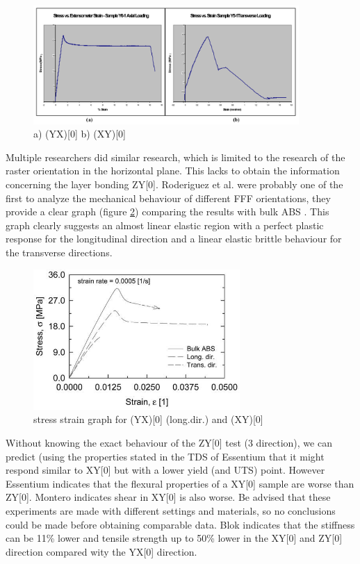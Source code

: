 \begin{figure}[H]
    \centering
    \includegraphics[width=0.9\textwidth]{chapter_2/figures/Transverseraster.PNG}
    \caption{a) (YX)[0] b) (XY)[0] \cite{Montero2001MaterialExperiments}}
    \label{fig:Transverseraster}
\end{figure}

Multiple researchers did similar research, which is limited to the research of the raster orientation in the horizontal plane. This lacks to obtain the information concerning the layer bonding ZY[0]. Roderiguez et al. were probably one of the first to analyze the mechanical behaviour of different FFF orientations, they provide a clear graph (figure \ref{fig:Rodriguezgraph}) comparing the results with bulk ABS \cite{Rodriguez2001MechanicalInvestigation}. This graph clearly suggests an almost linear elastic region with a perfect plastic response for the longitudinal direction and a linear elastic brittle behaviour for the transverse directions. 

\begin{figure}[H]
    \centering
    \includegraphics[width=0.7\textwidth]{chapter_2/figures/Rodriguezgraph.jpg}
    \caption{stress strain graph for (YX)[0] (long.dir.) and (XY)[0] \cite{Rodriguez2001MechanicalInvestigation}}
    \label{fig:Rodriguezgraph}
\end{figure}

Without knowing the exact behaviour of the ZY[0] test (3 direction), we can predict (using the properties stated in the TDS of Essentium \cite{EssentiumTechnicalPLA} that it might respond similar to XY[0] but with a lower yield (and UTS) point. However Essentium indicates that the flexural properties of a XY[0] sample are worse than ZY[0]. Montero indicates shear in XY[0] is also worse. Be advised that these experiments are made with different settings and materials, so no conclusions could be made before obtaining comparable data. Blok \cite{Blok2018AnComposites} indicates that the stiffness can be 11\% lower and tensile strength up to 50\% lower in the XY[0] and ZY[0] direction compared wity the YX[0] direction. 

